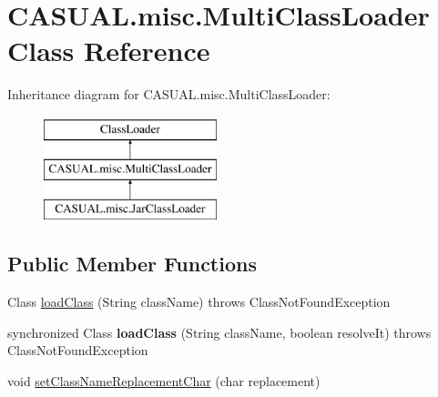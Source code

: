 \hypertarget{classCASUAL_1_1misc_1_1MultiClassLoader}{\section{C\-A\-S\-U\-A\-L.\-misc.\-Multi\-Class\-Loader Class Reference}
\label{classCASUAL_1_1misc_1_1MultiClassLoader}
}
Inheritance diagram for C\-A\-S\-U\-A\-L.\-misc.\-Multi\-Class\-Loader\-:\begin{figure}[H]
\begin{center}
\leavevmode
\includegraphics[height=3.000000cm]{classCASUAL_1_1misc_1_1MultiClassLoader}
\end{center}
\end{figure}
\subsection*{Public Member Functions}
\begin{DoxyCompactItemize}
\item 
Class \hyperlink{classCASUAL_1_1misc_1_1MultiClassLoader_a55eb86977110bf1b756eb0d3fb4fd94e}{load\-Class} (String class\-Name)  throws Class\-Not\-Found\-Exception 
\item 
\hypertarget{classCASUAL_1_1misc_1_1MultiClassLoader_abff00159b724689d0be2e0b927a591b4}{synchronized Class {\bfseries load\-Class} (String class\-Name, boolean resolve\-It)  throws Class\-Not\-Found\-Exception }\label{classCASUAL_1_1misc_1_1MultiClassLoader_abff00159b724689d0be2e0b927a591b4}

\item 
void \hyperlink{classCASUAL_1_1misc_1_1MultiClassLoader_a185926422f007e59628c04e199596b36}{set\-Class\-Name\-Replacement\-Char} (char replacement)
\end{DoxyCompactItemize}
